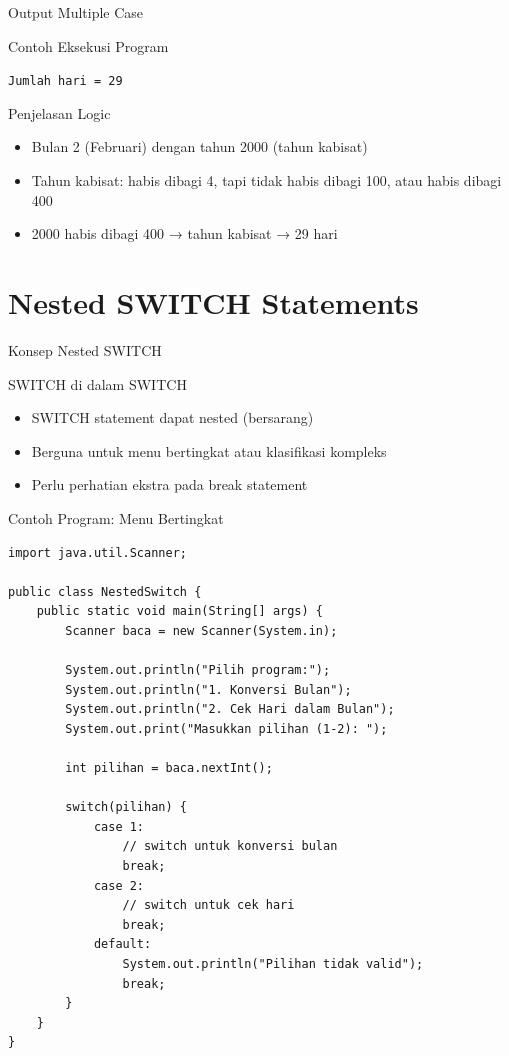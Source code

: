 \documentclass{beamer}
\begin{document}
\begin{frame}{Output Multiple Case}
\begin{block}{Contoh Eksekusi Program}
\colorbox{gray!20}{
    \parbox{0.9\textwidth}{
        \texttt{Jumlah hari = 29}
    }
}
\end{block}

\begin{block}{Penjelasan Logic}
\begin{itemize}
\item Bulan 2 (Februari) dengan tahun 2000 (tahun kabisat)
\item Tahun kabisat: habis dibagi 4, tapi tidak habis dibagi 100, atau habis dibagi 400
\item 2000 habis dibagi 400 → tahun kabisat → 29 hari
\end{itemize}
\end{block}
\end{frame}

\section{Nested SWITCH Statements}
\begin{frame}[fragile]{Konsep Nested SWITCH}
  \begin{block}{SWITCH di dalam SWITCH}
    \begin{itemize}
      \item SWITCH statement dapat nested (bersarang)
      \item Berguna untuk menu bertingkat atau klasifikasi kompleks
      \item Perlu perhatian ekstra pada break statement
    \end{itemize}
  \end{block}

  \begin{exampleblock}{Contoh Program: Menu Bertingkat}
    \begin{lstlisting}
import java.util.Scanner;

public class NestedSwitch {
    public static void main(String[] args) {
        Scanner baca = new Scanner(System.in);
        
        System.out.println("Pilih program:");
        System.out.println("1. Konversi Bulan");
        System.out.println("2. Cek Hari dalam Bulan");
        System.out.print("Masukkan pilihan (1-2): ");
        
        int pilihan = baca.nextInt();
        
        switch(pilihan) {
            case 1:
                // switch untuk konversi bulan
                break;
            case 2:
                // switch untuk cek hari
                break;
            default: 
                System.out.println("Pilihan tidak valid");
                break;
        }
    }
}
    \end{lstlisting}
  \end{exampleblock}
\end{frame}
\end{document}
